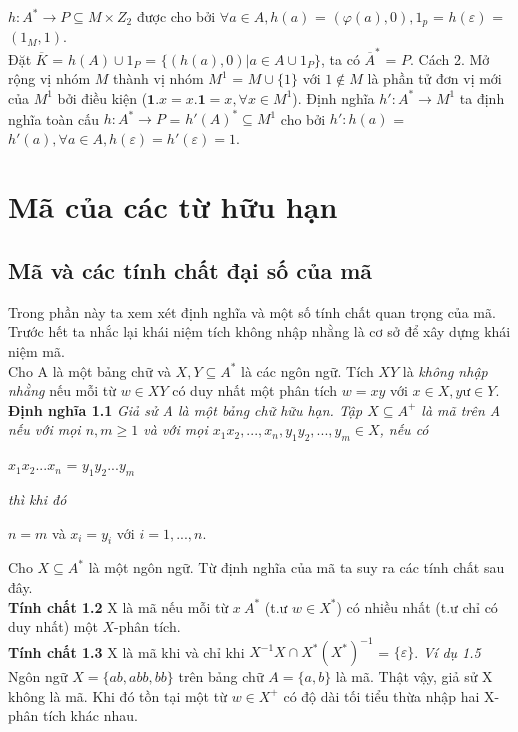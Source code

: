 \begin{flushleft}
\begin{flushleft}
$h : A^* \to P \subseteq M \times Z_2$ được cho bởi $\forall a \in A, h(a)$ = $(\varphi (a) , 0), 1_p$ = $h(\varepsilon)$ = $(1_M, 1)$.\\
Đặt $\overline{K}$ = $h(A) \cup 1_P$ = $\{ (h(a), 0) | a \in A \cup 1_P \}$, ta có $\overline{A}^*$ = $P$.
\hspace{10mm}Cách 2. Mở rộng vị nhóm $M$ thành vị nhóm $M^1$ = $M \cup \{1\}$ với $1 \not\in M$ là phần tử đơn vị mới của $M^1$ bởi điều kiện ($\textbf{1}.x = x.\textbf{1} = x, \forall x \in M^1$).
\hspace{10mm}Định nghĩa $h' : A^* \to M^1$ ta định nghĩa toàn cấu $h : A^* \to P$ = $h'(A)^* \subseteq M^1$ cho bởi $h' : h(a)$ = $h'(a), \forall a \in A, h(\varepsilon) = h'(\varepsilon) = 1$.
\section{Mã của các từ hữu hạn}
\subsection{Mã và các tính chất đại số của mã}
Trong phần này ta xem xét định nghĩa và một số tính chất quan trọng của mã. Trước hết ta nhắc lại khái niệm tích không nhập nhằng là cơ sở để xây dựng khái niệm mã.\\
\hspace{10mm}Cho A là một bảng chữ và $X, Y \subseteq A^*$ là các ngôn ngữ. Tích $XY$ là \textit{không nhập nhằng} nếu mỗi từ $w \in XY$ có duy nhất một phân tích $w = xy$ với $x \in X, y ư\in Y$.\\
\textbf{Định nghĩa 1.1}     \textit{Giả sử A là một bảng chữ hữu hạn. Tập $X \subseteq A^+ $ là mã trên A nếu với mọi $n,m \ge 1$ và với mọi $x_1x_2,...,x_n,y_1y_2,...,y_m \in X$, nếu có} 
\end{flushleft}
\end{flushleft}
$x_1x_2...x_n$ = $y_1y_2...y_m$
\begin{flushleft}
\textit{thì khi đó}
\end{flushleft}
$n = m$ và  $x_i = y_i$     với     $i = 1,...,n$.
\begin{flushleft}
Cho $X \subseteq A^*$ là một ngôn ngữ. Từ định nghĩa của mã ta suy ra các tính chất sau đây.\\
\textbf{Tính chất 1.2}      X là mã nếu mỗi từ $x \ A^*$ (t.ư $w \in X^*$) có nhiều nhất (t.ư chỉ có duy nhất) một $X$-phân tích.\\
\textbf{Tính chất 1.3}    X là mã khi và chỉ khi $X^{-1}X \cap X^*(X^*)^{-1}$ = $\{ \varepsilon \}$.
\textit{Ví dụ 1.5}  Ngôn ngữ $X = \{ ab,abb,bb \}$ trên bảng chữ $A = \{ a,b \}$ là mã. Thật vậy, giả sử X không là mã. Khi đó tồn tại một từ $w \in X^+$ có độ dài tối tiểu thừa nhập hai X-phân tích khác nhau.
\end{flushleft}
